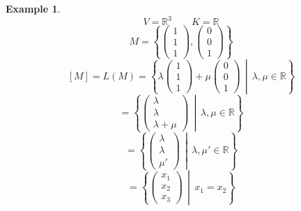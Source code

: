 \documentclass[a4paper,landscape,twocolumn]{article}
\newcommand\set[1]{\left\{#1\right\}}
\newcommand\setdef[2]{\left\{#1\,\middle|\,#2\right\}}
\newtheorem{ex}{Example}[section]
\begin{document}
\begin{ex}
  \[ V = \mathbb R^3 \qquad K = \mathbb R \]
  \[ M = \set{\begin{pmatrix} 1 \\ 1 \\ 1 \end{pmatrix}, \begin{pmatrix} 0 \\ 0 \\ 1 \end{pmatrix}} \]
  \[ [M] = L(M) = \setdef{\lambda \begin{pmatrix} 1 \\ 1 \\ 1\end{pmatrix} + \mu \begin{pmatrix} 0 \\ 0 \\ 1 \end{pmatrix}}{\lambda, \mu \in \mathbb R} \]
  \[ = \setdef{\begin{pmatrix} \lambda \\ \lambda \\ \lambda + \mu \end{pmatrix}}{\lambda, \mu \in \mathbb R} \]
  \[ = \setdef{\begin{pmatrix} \lambda \\ \lambda \\ \mu' \end{pmatrix}}{\lambda, \mu' \in \mathbb R} \]
  \[ = \setdef{\begin{pmatrix} x_1 \\ x_2 \\ x_3 \end{pmatrix}}{x_1 = x_2} \]
\end{ex}
\end{document}
